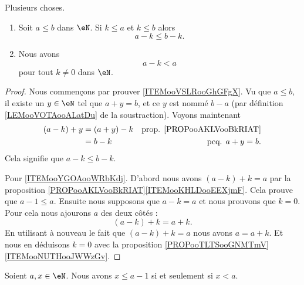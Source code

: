 \begin{proposition}	\label{PROPooJSZHooVDzBDE}
	Plusieurs choses.
	\begin{enumerate}
		\item		\label{ITEMooVSLRooGhGFgX}
		      Soit \( a\leq b\) dans \( \eN\). Si \( k\leq a\) et \( k\leq b\) alors
		      \begin{equation}
			      a-k\leq b-k.
		      \end{equation}
		\item		\label{ITEMooYGOAooWRbKdj}
		      Nous avons
		      \begin{equation}
			      a-k<a
		      \end{equation}
		      pour tout \( k\neq 0\) dans \( \eN\).
	\end{enumerate}
\end{proposition}

\begin{proof}
	Nous commençons par prouver \ref{ITEMooVSLRooGhGFgX}. Vu que \( a\leq b\), il existe un \( y\in \eN\) tel que \( a+y=b\), et ce \( y\) est nommé \( b-a\) (par définition \ref{LEMooVOTAooALatDu} de la soustraction). Voyons maintenant
	\begin{subequations}
		\begin{align}
			(a-k)+y & =(a+y)-k & \text{prop. \ref{PROPooAKLVooBkRIAT}} \\
			        & =b-k     & \text{pcq. \( a+y=b\)}.
		\end{align}
	\end{subequations}
	Cela signifie que \( a-k\leq b-k\).

	Pour \ref{ITEMooYGOAooWRbKdj}. D'abord nous avons \((a-k)+k=a \) par la proposition \ref{PROPooAKLVooBkRIAT}\ref{ITEMooKHLDooEEXjmF}. Cela prouve que \( a-1\leq a\). Ensuite nous supposons que \( a-k=a\) et nous prouvons que \( k=0\). Pour cela nous ajourons \( a\) des deux côtés :
	\begin{equation}
		(a-k)+k=a+k.
	\end{equation}
	En utilisant à nouveau le fait que \( (a-k)+k=a\) nous avons \( a=a+k\). Et nous en déduisons \( k=0\) avec la proposition \ref{PROPooTLTSooGNMTmV}\ref{ITEMooNUTHooJWWzGv}.
\end{proof}

\begin{proposition}	\label{PROPooHRCOooBkEvud}
	Soient \( a,x\in \eN\). Nous avons \( x\leq a-1\) si et seulement si \( x<a\).
\end{proposition}

